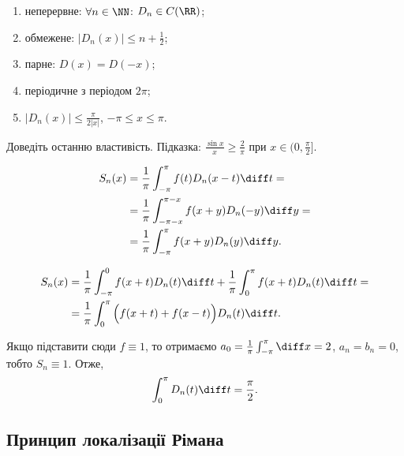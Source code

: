 \begin{properties}
    $\left.\right.$
    \begin{enumerate}
        \item неперервне: $\forall n \in \NN$: $D_n\in C(\RR)$;
        \item обмежене: $|D_n(x)| \le n + \frac{1}{2}$;
        \item парне: $D(x) = D(-x)$;
        \item періодичне з періодом $2 \pi$;
        \item $|D_n(x)| \le \frac{\pi}{2|x|}$, $-\pi\le x\le\pi$.
    \end{enumerate}
\end{properties}

\begin{exercise}
    Доведіть останню властивість. Підказка: $\frac{\sin x}{x} \ge \frac{2}{\pi}$ при $x \in (0, \frac{\pi}{2}]$.
\end{exercise}

\begin{equation}
    \begin{aligned}
        S_n(x) 
        &= \frac{1}{\pi} \int_{-\pi}^\pi f(t) D_n(x - t) \diff t = \\
        &= \frac{1}{\pi} \int_{-\pi-x}^{\pi-x} f(x + y) D_n(-y) \diff y = \\
        &= \frac{1}{\pi} \int_{-\pi}^\pi f(x + y) D_n(y) \diff y.
    \end{aligned}
\end{equation}

\begin{equation}
    \begin{aligned}
        S_n(x) 
        &= \frac{1}{\pi} \int_{-\pi}^0 f(x + t) D_n(t) \diff t + \frac{1}{\pi} \int_0^\pi f(x + t) D_n(t) \diff t = \\
        &= \frac{1}{\pi} \int_0^\pi \Big( f(x + t) + f(x - t) \Big) D_n(t) \diff t.
    \end{aligned}
\end{equation}

Якщо підставити сюди $f \equiv 1$, то отримаємо $a_0 = \frac{1}{\pi} \int_{-\pi}^\pi \diff x = 2$, $a_n = b_n = 0$, тобто $S_n \equiv 1$. Отже,
\begin{equation}
    \int_0^\pi D_n(t) \diff t = \frac{\pi}{2}.
\end{equation}

\subsection{Принцип локалізації Рімана}

